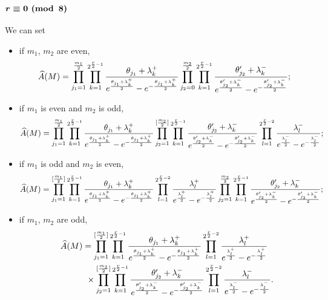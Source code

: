 \documentclass[10pt,a4paper]{amsart}
\newcommand{\A}{\mbox{$\widehat A$}}
\numberwithin{equation}{section}
\begin{document}
\subsubsection[$r\equiv 0 \,\,{\rm (mod\,\,\,8)}$]{$\boldsymbol{r\equiv 0 \,\,{\rm (mod\,\,\,8)}}$}
We can set
\begin{itemize}\itemsep=0pt
\item if $m_1$, $m_2$ are even,
\begin{gather*}
\A(M)
=\prod_{j_1=1}^{{m_1\over2}}\prod_{k=1}^{2^{{r\over 2}-1}}{\theta_{j_1}
+ \lambda_k^+\over e^{\theta_{j_1} + \lambda_k^+\over 2}
-e^{-{\theta_{j_1 }+ \lambda_k^+\over 2}}}
\prod_{j_2=0}^{{m_2\over 2}}\prod_{k=1}^{2^{{r\over 2}-1}}{\theta_{j_2}'
+ \lambda_{k}^-\over e^{\theta_{j_2}'
+ \lambda_{k}^-\over 2}
-e^{-{\theta_{j_2}' + \lambda_{k}^-\over 2}}};
\end{gather*}

\item if $m_1$ is even and $m_2$ is odd,
\begin{gather*}
\A(M)= \prod_{j_1=1}^{{m_1\over2}}\prod_{k=1}^{2^{{r\over 2}-1}}{\theta_{j_1}
+ \lambda_k^+\over e^{\theta_{j_1} + \lambda_k^+\over 2}
-e^{-{\theta_{j_1 }+ \lambda_k^+\over 2}}}
\prod_{j_2=1}^{[{m_2\over 2}]}\prod_{k=1}^{2^{{r\over 2}-1}}{\theta_{j_2}'
+ \lambda_{k}^-\over e^{\theta_{j_2}'
+ \lambda_{k}^-\over 2}
-e^{-{\theta_{j_2}' + \lambda_{k}^-\over 2}}}
\prod_{l=1}^{2^{{r\over 2}-2}} {\lambda_{l}^-\over e^{\lambda_{l}^-\over 2}
-e^{-{\lambda_{l}^-\over 2}}} ;
\end{gather*}

 \item if $m_1$ is odd and $m_2$ is even,
\begin{gather*}
\A(M) =\prod_{j_1=1}^{[{m_1\over2}]}\prod_{k=1}^{2^{{r\over 2}-1}}{\theta_{j_1}
+ \lambda_k^+\over e^{\theta_{j_1} + \lambda_k^+\over 2}
-e^{-{\theta_{j_1 }+ \lambda_k^+\over 2}}}
\prod_{l=1}^{2^{{r\over 2}-2}} {\lambda_{l}^+\over e^{\lambda_{l}^+\over 2}
-e^{-{\lambda_{l}^+\over 2}}}
\prod_{j_2=1}^{{m_2\over 2}}\prod_{k=1}^{2^{{r\over 2}-1}}{\theta_{j_2}'
+ \lambda_{k}^-\over e^{\theta_{j_2}'
+ \lambda_{k}^-\over 2}
-e^{-{\theta_{j_2}' + \lambda_{k}^-\over 2}}} ;
\end{gather*}

 \item if $m_1$, $m_2$ are odd,
\begin{gather*}
\A(M)
=\prod_{j_1=1}^{[{m_1\over2}]}\prod_{k=1}^{2^{{r\over 2}-1}}{\theta_{j_1}
+ \lambda_k^+\over e^{\theta_{j_1} + \lambda_k^+\over 2}
-e^{-{\theta_{j_1 }+ \lambda_k^+\over 2}}} \prod_{l=1}^{2^{{r\over 2}-2}} {\lambda_{l}^+\over e^{\lambda_{l}^+\over 2}
-e^{-{\lambda_{l}^+\over 2}}}\\
\hphantom{\A(M)=}{} \times
 \prod_{j_2=1}^{[{m_2\over 2}]}\prod_{k=1}^{2^{{r\over 2}-1}}{\theta_{j_2}'
+ \lambda_{k}^-\over e^{\theta_{j_2}'+ \lambda_{k}^-\over 2}-e^{-{\theta_{j_2}' + \lambda_{k}^-\over 2}}}\prod_{l=1}^{2^{{r\over 2}-2}} {\lambda_{l}^-\over e^{\lambda_{l}^-\over 2} -e^{-{\lambda_{l}^-\over 2}}} .
\end{gather*}
\end{itemize}
\end{document}

